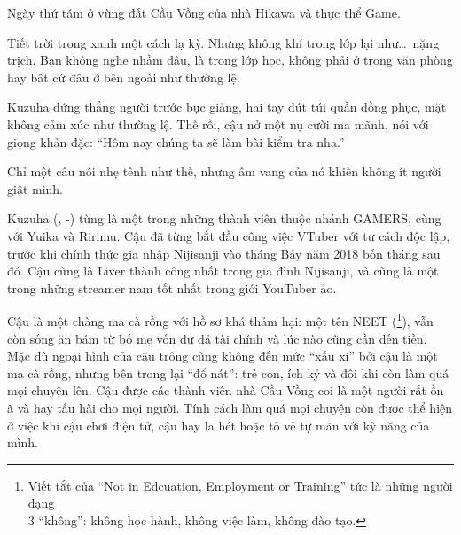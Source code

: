 \documentclass[../main.tex]{subfiles}
\begin{document}

Ngày thứ tám ở vùng đất Cầu Vồng của nhà Hikawa và thực thể Game.


Tiết trời trong xanh một cách lạ kỳ. Nhưng không khí trong lớp lại như\dots\ nặng trịch. Bạn không nghe nhầm đâu, là trong lớp học, không phải ở trong văn phòng hay bât cứ đâu ở bên ngoài như thường lệ.

Kuzuha đứng thẳng người trước bục giảng, hai tay đút túi quần đồng phục, mặt không cảm xúc như thường lệ. Thế rồi, cậu nở một nụ cười ma mãnh, nói với giọng khản đặc: ``Hôm nay chúng ta sẽ làm bài kiểm tra nha.''

Chỉ một câu nói nhẹ tênh như thế, nhưng âm vang của nó khiến không ít người giật mình.

\chrint

Kuzuha (, -) từng là một trong những thành viên thuộc nhánh GAMERS, cùng với Yuika và Ririmu. Cậu đã từng bắt đầu công việc VTuber với tư cách độc lập, trước khi chính thức gia nhập Nijisanji vào tháng Bảy năm 2018 bốn tháng sau đó. Cậu cũng là Liver thành công nhất trong gia đình Nijisanji, và cũng là một trong những streamer nam tốt nhất trong giới YouTuber ảo.

Cậu là một chàng ma cà rồng với hồ sơ khá thảm hại: một tên NEET (\footnote{Viết tắt của ``Not in Edcuation, Employment or Training'' tức là những người dạng\\3 ``không'': không học hành, không việc làm, không đào tạo.}), vẫn còn sống ăn bám từ bố mẹ vốn dư dả tài chính và lúc nào cũng cần đến tiền. Mặc dù ngoại hình của cậu trông cũng không đến mức ``xấu xí'' bởi cậu là một ma cà rồng, nhưng bên trong lại ``đổ nát'': trẻ con, ích kỷ và đôi khi còn làm quá mọi chuyện lên. Cậu được các thành viên nhà Cầu Vồng coi là một người rất ồn ã và hay tấu hài cho mọi người. Tính cách làm quá mọi chuyện còn được thể hiện ở việc khi cậu chơi điện tử, cậu hay la hét hoặc tỏ vẻ tự mãn với kỹ năng của mình.
\end{document}
